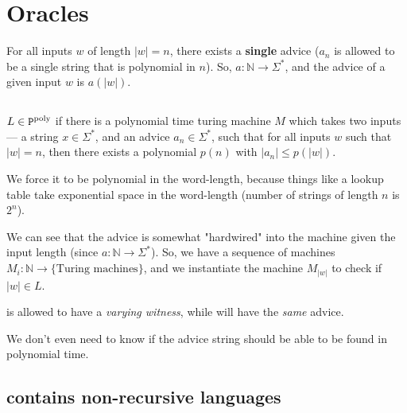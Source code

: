 \section{Oracles}

For all inputs $w$ of length $|w| = n$, there exists a \textbf{single} advice
($a_n$ is allowed to be a single string that is polynomial in $n$).
So, $a: \mathbb{N} \to \Sigma^*$, and the advice of a given input $w$ is $a(|w|)$.


\subsection{\ppoly}

$L \in \text{$\texttt{P}^{\text{poly}}$}$ if there is a polynomial time turing machine $M$ which
takes two inputs --- a string $x \in \Sigma^*$, and an advice $a_n \in \Sigma^*$,
such that for all inputs $w$ such that $|w| = n$, then there exists a polynomial
$p(n)$ with $|a_n| \leq p(|w|)$.

We force it to be polynomial in the word-length, because things like a lookup
table take exponential space in the word-length (number of strings of length $n$
is $2^n$).

We can see that the advice is somewhat "hardwired" into the machine given
the input length (since $a: \mathbb{N} \to \Sigma^*$). So, we have a 
sequence of machines $M_i: \mathbb{N} \to \{ \text{Turing machines} \}$, and we instantiate
the machine $M_{|w|}$ to check if $|w| \in L$.

\nptime is allowed to have a \textit{varying witness}, while \ppoly will have
the \textit{same} advice.

We don't even need to know if the advice string should be able to be found
in polynomial time.

\subsection{\ppoly contains non-recursive languages}
